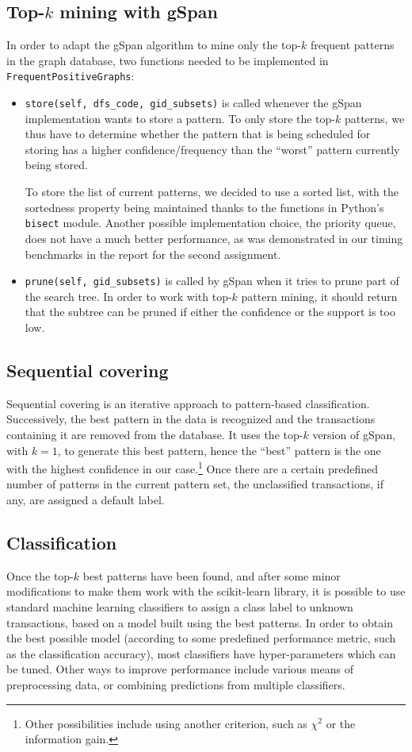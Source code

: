 \documentclass{sigkddExp}
\newcommand{\py}[1]{\texttt{#1}}
\newcommand{\gspan}{\textsf{gSpan}}
\begin{document}
\subsection{Top-\(k\) mining with gSpan}
In order to adapt the \gspan{} algorithm to mine only the top-\(k\) frequent patterns in the graph database, two functions needed to be implemented in \py{FrequentPositiveGraphs}:
\begin{itemize}
	\item \py{store(self, dfs_code, gid_subsets)} is called whenever the \gspan{} implementation wants to store a pattern.
	To only store the top-\(k\) patterns, we thus have to determine whether the pattern that is being scheduled for storing has a higher confidence/frequency than the ``worst'' pattern currently being stored.
	
	To store the list of current patterns, we decided to use a sorted list, with the sortedness property being maintained thanks to the functions in Python's \py{bisect} module.
	Another possible implementation choice, the priority queue, does not have a much better performance, as was demonstrated in our timing benchmarks in the report for the second assignment.
	\item \py{prune(self, gid_subsets)} is called by \gspan{} when it tries to prune part of the search tree.
	In order to work with top-\(k\) pattern mining, it should return that the subtree can be pruned if either the confidence or the support is too low.
\end{itemize}

\subsection{Sequential covering}
Sequential covering is an iterative approach to pattern-based classification.
Successively, the best pattern in the data is recognized and the transactions containing it are removed from the database.
It uses the top-\(k\) version of \gspan, with \(k = 1\), to generate this best pattern, hence the ``best'' pattern is the one with the highest confidence in our case.\footnote{Other possibilities include using another criterion, such as \(\chi^2\) or the information gain.}
Once there are a certain predefined number of patterns in the current pattern set, the unclassified transactions, if any, are assigned a default label.

\subsection{Classification}
Once the top-\(k\) best patterns have been found, and after some minor modifications to make them work with the scikit-learn library, it is possible to use standard machine learning classifiers to assign a class label to unknown transactions, based on a model built using the best patterns.
In order to obtain the best possible model (according to some predefined performance metric, such as the classification accuracy), most classifiers have hyper-parameters which can be tuned.
Other ways to improve performance include various means of preprocessing data, or combining predictions from multiple classifiers.
\end{document}
